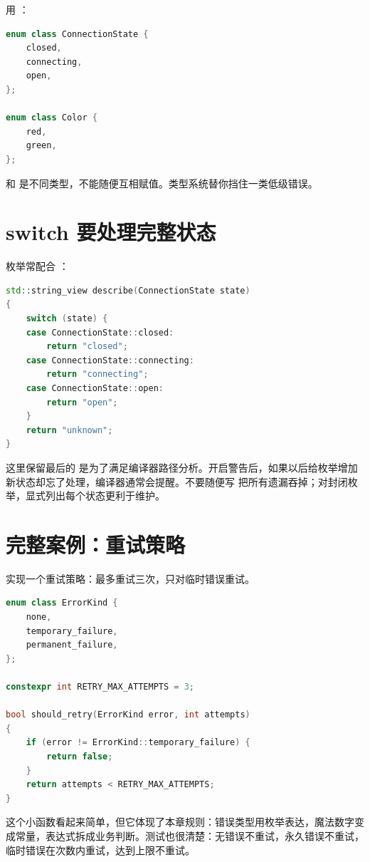 用 ：

\begin{lstlisting}[language=C++,caption={强类型枚举}]
enum class ConnectionState {
    closed,
    connecting,
    open,
};

enum class Color {
    red,
    green,
};
\end{lstlisting}

 和  是不同类型，不能随便互相赋值。类型系统替你挡住一类低级错误。

\section{switch 要处理完整状态}

枚举常配合 ：

\begin{lstlisting}[language=C++,caption={处理连接状态}]
std::string_view describe(ConnectionState state)
{
    switch (state) {
    case ConnectionState::closed:
        return "closed";
    case ConnectionState::connecting:
        return "connecting";
    case ConnectionState::open:
        return "open";
    }
    return "unknown";
}
\end{lstlisting}

这里保留最后的  是为了满足编译器路径分析。开启警告后，如果以后给枚举增加新状态却忘了处理，编译器通常会提醒。不要随便写  把所有遗漏吞掉；对封闭枚举，显式列出每个状态更利于维护。

\section{完整案例：重试策略}

实现一个重试策略：最多重试三次，只对临时错误重试。

\begin{lstlisting}[language=C++,caption={重试策略}]
enum class ErrorKind {
    none,
    temporary_failure,
    permanent_failure,
};

constexpr int RETRY_MAX_ATTEMPTS = 3;

bool should_retry(ErrorKind error, int attempts)
{
    if (error != ErrorKind::temporary_failure) {
        return false;
    }
    return attempts < RETRY_MAX_ATTEMPTS;
}
\end{lstlisting}

这个小函数看起来简单，但它体现了本章规则：错误类型用枚举表达，魔法数字变成常量，表达式拆成业务判断。测试也很清楚：无错误不重试，永久错误不重试，临时错误在次数内重试，达到上限不重试。

